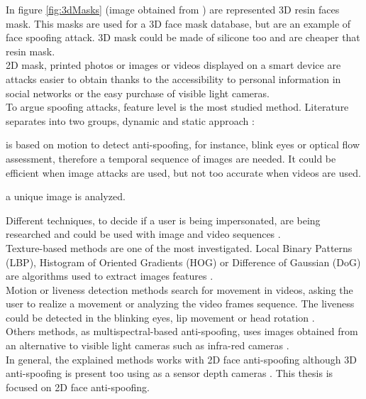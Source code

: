 In figure \ref{fig:3dMasks} (image obtained from \cite{3dmask}) are represented 3D resin faces mask. This masks are used for a 3D face mask database, but are an example of face spoofing attack. 3D mask could be made of silicone too and are cheaper that resin mask.\\

2D mask, printed photos or images or videos displayed on a smart device are attacks easier to obtain thanks to the accessibility to personal information in social networks or the easy purchase of visible light cameras.\\

To argue spoofing attacks, feature level is the most studied method. Literature separates into two groups, dynamic and static approach \cite{Spoofing_survey}:
\begin{description}[itemsep=2pt,topsep=8pt,parsep=0pt,partopsep=20pt]
\item[Dynamic:] is based on motion to detect anti-spoofing, for instance, blink eyes or optical flow assessment, therefore a temporal sequence of images are needed. It could be efficient when image attacks are used, but not too accurate when videos are used.
\item[Static:] a unique image is analyzed.
\end{description}

Different techniques, to decide if a user is being impersonated, are being researched and could be used with image and video sequences \cite{Spoofing_survey}.\\

Texture-based methods are one of the most investigated. Local Binary Patterns (LBP),  Histogram of Oriented Gradients (HOG) or Difference of Gaussian (DoG) are algorithms used to extract images features \cite{distorsion,Spoofing_survey}.\\

Motion or liveness detection methods search for movement in videos, asking the user to realize a movement or analyzing the video frames sequence. The liveness could be detected in the blinking eyes, lip movement or head rotation \cite{distorsion,Spoofing_survey}.\\

Others methods, as multispectral-based anti-spoofing, uses images obtained from an alternative to visible light cameras such as infra-red cameras \cite{distorsion}.\\

In general, the explained methods works with 2D face anti-spoofing although 3D anti-spoofing is present too using as a sensor depth cameras \cite{2d_3d_face}. This thesis is focused on 2D face anti-spoofing.\\
